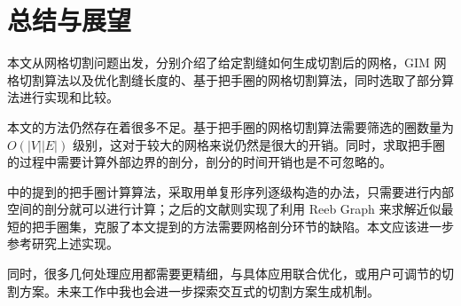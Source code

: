 
\chapter{总结与展望}

本文从网格切割问题出发，分别介绍了给定割缝如何生成切割后的网格，GIM 网格切割算法以及优化割缝长度的、基于把手圈的网格切割算法，同时选取了部分算法进行实现和比较。

本文的方法仍然存在着很多不足。基于把手圈的网格切割算法需要筛选的圈数量为 $ O(|V||E|) $ 级别，这对于较大的网格来说仍然是很大的开销。同时，求取把手圈的过程中需要计算外部边界的剖分，剖分的时间开销也是不可忽略的。

\citet{Dey2008} 中的提到的把手圈计算算法，采取用单复形序列逐级构造的办法，只需要进行内部空间的剖分就可以进行计算；之后的文献\cite{Dey2013}则实现了利用 Reeb Graph 来求解近似最短的把手圈集，克服了本文提到的方法需要网格剖分环节的缺陷。本文应该进一步参考研究上述实现。

同时，很多几何处理应用都需要更精细，与具体应用联合优化，或用户可调节的切割方案。未来工作中我也会进一步探索交互式的切割方案生成机制。